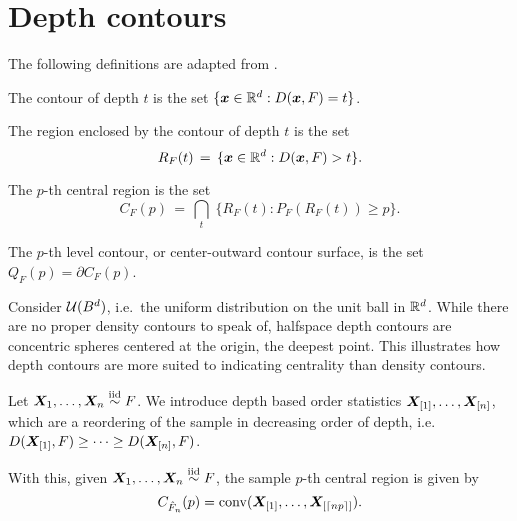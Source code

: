 \section{Depth contours}
\label{sec:multivariate_depthcontours}

The following definitions are adapted from \cite{liu-parelius-singh-1999}.

\begin{definition}
    The contour of depth $t$ is the set $\{\bm{x} \in \mathbb{R}^d : D(\bm{x}, F) = t\}$.
\end{definition}

\begin{definition}
    The region enclosed by the contour of depth $t$ is the set
    \begin{equation}
        R_F(t) \,=\, \{\bm{x} \in \mathbb{R}^d : D(\bm{x}, F) > t\}.
    \end{equation}
\end{definition}

\begin{definition}
    The $p$-th central region is the set
    \begin{equation}
        C_F(p) \,=\, \bigcap_{t}\; \{R_F(t) : P_F(R_F(t)) \geq p\}.
    \end{equation}
\end{definition}

\begin{definition}
    The $p$-th level contour, or center-outward contour surface, is the set
    $Q_F(p) = \partial C_F(p)$.
\end{definition}


\begin{example}
    Consider $\mathcal{U}(B^d)$, i.e.\ the uniform distribution on the unit ball in
    $\mathbb{R}^d$.
    While there are no proper density contours to speak of, halfspace depth
    contours are concentric spheres centered at the origin, the deepest point.
    This illustrates how depth contours are more suited to indicating
    centrality than density contours.
\end{example}


\begin{definition}
    Let $\bm{X}_1, \dots, \bm{X}_n \overset{\text{iid}}{\sim} F$.
    We introduce depth based order statistics $\bm{X}_{[1]}, \dots, \bm{X}_{[n]}$,
    which are a reordering of the sample in decreasing order of depth, i.e.\
    $D(\bm{X}_{[1]}, F) \geq \dots \geq D(\bm{X}_{[n]}, F)$.
\end{definition}

With this, given $\bm{X}_1, \dots, \bm{X}_n \overset{\text{iid}}{\sim} F$, the sample $p$-th central
region is given by
\begin{equation}
    C_{\hat{F}_n}(p) = \operatorname{conv}(\bm{X}_{[1]}, \dots, \bm{X}_{[\lceil np \rceil]}).
\end{equation}
